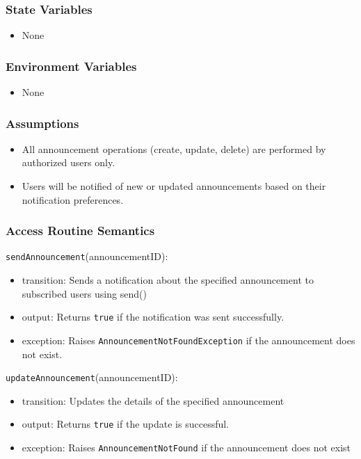 \documentclass[12pt, titlepage]{article}
\begin{document}
\subsubsection{State Variables}
\begin{itemize}
    \item None
\end{itemize}

\subsubsection{Environment Variables}
\begin{itemize}
    \item None
\end{itemize}

\subsubsection{Assumptions}
\begin{itemize}
    \item All announcement operations (create, update, delete) are performed by authorized users only.
    \item Users will be notified of new or updated announcements based on their notification preferences.
\end{itemize}

\subsubsection{Access Routine Semantics}

\noindent \texttt{sendAnnouncement}(announcementID):  
\begin{itemize}
    \item transition: Sends a notification about the specified announcement to subscribed users using send()
    \item output: Returns \texttt{true} if the notification was sent successfully.
    \item exception: Raises \texttt{AnnouncementNotFoundException} if the announcement does not exist.
\end{itemize}

\noindent \texttt{updateAnnouncement}(announcementID):  
\begin{itemize}
    \item transition: Updates the details of the specified announcement
    \item output: Returns \texttt{true} if the update is successful.
    \item exception: Raises \texttt{AnnouncementNotFound} if the announcement does not exist
\end{itemize}
\end{document}
